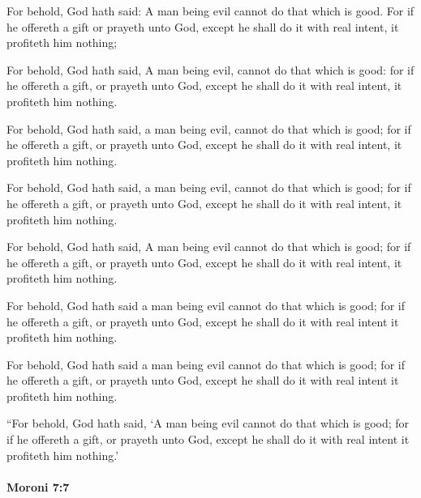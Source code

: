 			For behold, God hath said:
			A man being evil cannot do that which is good.
			For if he offereth a gift or prayeth unto God,
			except he shall do it with real intent,
			it profiteth him nothing;
			
			\begin{framed}
				\scriptsize
				\begin{compactdesc}
					\item[OM] [\textit{missing}]
					\item[PM] 
					\item[1830] For behold, God hath said, A man being evil, cannot do that which is good: for if he offereth a gift, or prayeth unto God, except he shall do it with real intent, it profiteth him nothing.
					\item[1837] For behold, God hath said, a man being evil, cannot do that which is good; for if he offereth a gift, or prayeth unto God, except he shall do it with real intent, it profiteth him nothing.
					\item[1840] For behold, God hath said, a man being evil, cannot do that which is good; for if he offereth a gift, or prayeth unto God, except he shall do it with real intent, it profiteth him nothing.
					\item[1879] For behold, God hath said, A man being evil cannot do that which is good; for if he offereth a gift, or prayeth unto God, except he shall do it with real intent, it profiteth him nothing.
					\item[1920] For behold, God hath said a man being evil cannot do that which is good; for if he offereth a gift, or prayeth unto God, except he shall do it with real intent it profiteth him nothing.
					\item[1981] For behold, God hath said a man being evil cannot do that which is good; for if he offereth a gift, or prayeth unto God, except he shall do it with real intent it profiteth him nothing.
					\item[ABM] ``For behold, God hath said, `A man being evil cannot do that which is good; for if he offereth a gift, or prayeth unto God, except he shall do it with real intent it profiteth him nothing.'
				\end{compactdesc}
			\end{framed}
			
		\paragraph{Moroni 7:7}
			\label{MORONI-7-7}
			
